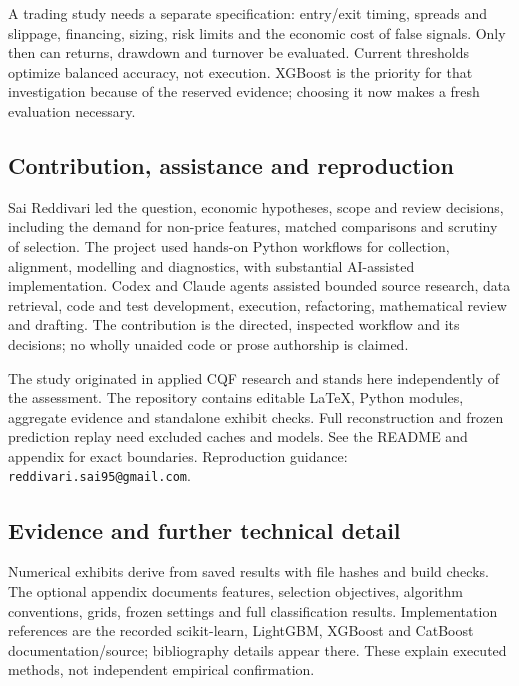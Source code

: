 \documentclass[11pt,a4paper]{article}
\begin{document}
A trading study needs a separate specification: entry/exit timing, spreads and slippage, financing, sizing, risk limits and the economic cost of false signals. Only then can returns, drawdown and turnover be evaluated. Current thresholds optimize balanced accuracy, not execution. XGBoost is the priority for that investigation because of the reserved evidence; choosing it now makes a fresh evaluation necessary.

\subsection*{Contribution, assistance and reproduction}
Sai Reddivari led the question, economic hypotheses, scope and review decisions, including the demand for non-price features, matched comparisons and scrutiny of selection. The project used hands-on Python workflows for collection, alignment, modelling and diagnostics, with substantial AI-assisted implementation. Codex and Claude agents assisted bounded source research, data retrieval, code and test development, execution, refactoring, mathematical review and drafting. The contribution is the directed, inspected workflow and its decisions; no wholly unaided code or prose authorship is claimed.

The study originated in applied CQF research and stands here independently of the assessment. The repository contains editable LaTeX, Python modules, aggregate evidence and standalone exhibit checks. Full reconstruction and frozen prediction replay need excluded caches and models. See the README and appendix for exact boundaries. Reproduction guidance: \texttt{reddivari.sai95@gmail.com}.

\subsection*{Evidence and further technical detail}
Numerical exhibits derive from saved results with file hashes and build checks. The optional appendix documents features, selection objectives, algorithm conventions, grids, frozen settings and full classification results. Implementation references are the recorded scikit-learn, LightGBM, XGBoost and CatBoost documentation/source; bibliography details appear there. These explain executed methods, not independent empirical confirmation.
\end{document}
